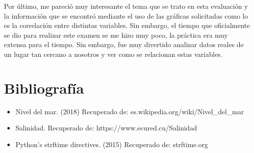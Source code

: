 \documentclass[12pt]{article}
\begin{document}
Por último, me pareció muy interesante el tema que se trato en esta evaluación y la información que se encontró mediante el uso de las gráficas solicitadas como lo es la correlación entre distintas variables. Sin embargo, el tiempo que oficialmente se dio para realizar este examen se me hizo muy poco, la práctica era muy extensa para el tiempo. Sin embargo, fue muy divertido analizar datos reales de un lugar tan cercano a nosotros y ver como se relacionan estas variables. 

\section{Bibliografía}
\begin{itemize}
    \item Nivel del mar. (2018) Recuperado de: es.wikipedia.org/wiki/Nivel\_del\_mar
    \item Salinidad. Recuperado de: https://www.ecured.cu/Salinidad
    \item Python's strftime directives. (2015) Recuperado de: strftime.org
\end{itemize}
\end{document}
